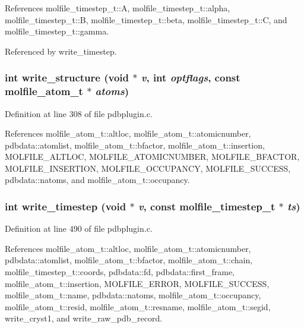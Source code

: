 References molfile\_\-timestep\_\-t::A, molfile\_\-timestep\_\-t::alpha, molfile\_\-timestep\_\-t::B, molfile\_\-timestep\_\-t::beta, molfile\_\-timestep\_\-t::C, and molfile\_\-timestep\_\-t::gamma.

Referenced by write\_\-timestep.
\subsubsection{\setlength{\rightskip}{0pt plus 5cm}int write\_\-structure (void $\ast$ {\em v}, int {\em optflags}, const {\bf molfile\_\-atom\_\-t} $\ast$ {\em atoms})\hspace{0.3cm}{\tt  [static]}}\label{pdbplugin_8c_a8}




Definition at line 308 of file pdbplugin.c.

References molfile\_\-atom\_\-t::altloc, molfile\_\-atom\_\-t::atomicnumber, pdbdata::atomlist, molfile\_\-atom\_\-t::bfactor, molfile\_\-atom\_\-t::insertion, MOLFILE\_\-ALTLOC, MOLFILE\_\-ATOMICNUMBER, MOLFILE\_\-BFACTOR, MOLFILE\_\-INSERTION, MOLFILE\_\-OCCUPANCY, MOLFILE\_\-SUCCESS, pdbdata::natoms, and molfile\_\-atom\_\-t::occupancy.
\subsubsection{\setlength{\rightskip}{0pt plus 5cm}int write\_\-timestep (void $\ast$ {\em v}, const {\bf molfile\_\-timestep\_\-t} $\ast$ {\em ts})\hspace{0.3cm}{\tt  [static]}}\label{pdbplugin_8c_a10}




Definition at line 490 of file pdbplugin.c.

References molfile\_\-atom\_\-t::altloc, molfile\_\-atom\_\-t::atomicnumber, pdbdata::atomlist, molfile\_\-atom\_\-t::bfactor, molfile\_\-atom\_\-t::chain, molfile\_\-timestep\_\-t::coords, pdbdata::fd, pdbdata::first\_\-frame, molfile\_\-atom\_\-t::insertion, MOLFILE\_\-ERROR, MOLFILE\_\-SUCCESS, molfile\_\-atom\_\-t::name, pdbdata::natoms, molfile\_\-atom\_\-t::occupancy, molfile\_\-atom\_\-t::resid, molfile\_\-atom\_\-t::resname, molfile\_\-atom\_\-t::segid, write\_\-cryst1, and write\_\-raw\_\-pdb\_\-record.

